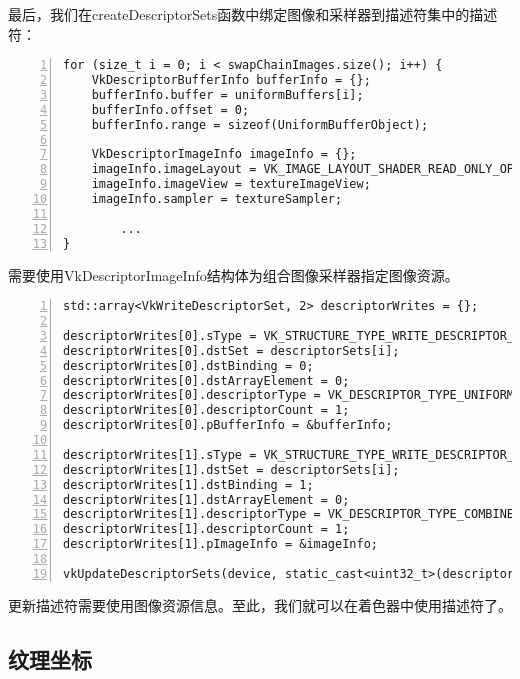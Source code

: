 \documentclass{ctexart}
\begin{document}
最后，我们在createDescriptorSets函数中绑定图像和采样器到描述符集中的描述符：

\begin{lstlisting}[language={[ANSI]C},keywordstyle=\color{blue!70},commentstyle=\color{red!50!green!50!blue!50},frame=shadowbox, rulesepcolor=\color{red!20!green!20!blue!20},basicstyle=\small,numbers=left, numberstyle=\tiny,breaklines=true]
for (size_t i = 0; i < swapChainImages.size(); i++) {
	VkDescriptorBufferInfo bufferInfo = {};
	bufferInfo.buffer = uniformBuffers[i];
	bufferInfo.offset = 0;
	bufferInfo.range = sizeof(UniformBufferObject);

	VkDescriptorImageInfo imageInfo = {};
	imageInfo.imageLayout = VK_IMAGE_LAYOUT_SHADER_READ_ONLY_OPTIMAL;
	imageInfo.imageView = textureImageView;
	imageInfo.sampler = textureSampler;

		...
}
\end{lstlisting}

需要使用VkDescriptorImageInfo结构体为组合图像采样器指定图像资源。

\begin{lstlisting}[language={[ANSI]C},keywordstyle=\color{blue!70},commentstyle=\color{red!50!green!50!blue!50},frame=shadowbox, rulesepcolor=\color{red!20!green!20!blue!20},basicstyle=\small,numbers=left, numberstyle=\tiny,breaklines=true]
std::array<VkWriteDescriptorSet, 2> descriptorWrites = {};

descriptorWrites[0].sType = VK_STRUCTURE_TYPE_WRITE_DESCRIPTOR_SET;
descriptorWrites[0].dstSet = descriptorSets[i];
descriptorWrites[0].dstBinding = 0;
descriptorWrites[0].dstArrayElement = 0;
descriptorWrites[0].descriptorType = VK_DESCRIPTOR_TYPE_UNIFORM_BUFFER;
descriptorWrites[0].descriptorCount = 1;
descriptorWrites[0].pBufferInfo = &bufferInfo;

descriptorWrites[1].sType = VK_STRUCTURE_TYPE_WRITE_DESCRIPTOR_SET;
descriptorWrites[1].dstSet = descriptorSets[i];
descriptorWrites[1].dstBinding = 1;
descriptorWrites[1].dstArrayElement = 0;
descriptorWrites[1].descriptorType = VK_DESCRIPTOR_TYPE_COMBINED_IMAGE_SAMPLER;
descriptorWrites[1].descriptorCount = 1;
descriptorWrites[1].pImageInfo = &imageInfo;

vkUpdateDescriptorSets(device, static_cast<uint32_t>(descriptorWrites.size()), descriptorWrites.data(), 0, nullptr);
\end{lstlisting}

更新描述符需要使用图像资源信息。至此，我们就可以在着色器中使用描述符了。

\subsection{纹理坐标}
\end{document}
